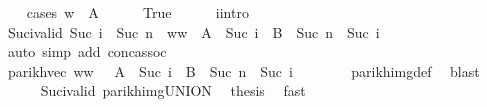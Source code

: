 \begin{isabellebody}
\ \ \isamarkupfalse%
\ {\isacharparenleft}{\kern0pt}cases\ {\isachardoublequoteopen}w{}\ {\isasymin}\ A{\isachardoublequoteclose}{\isacharparenright}{\kern0pt}\isanewline
\ \ \ \ \isamarkupfalse%
\ True\isanewline
\ \ \ \ \isamarkupfalse%
\ i{\isacharunderscore}{\kern0pt}intro\ \isamarkupfalse%
\ Suc{\isacharunderscore}{\kern0pt}i{\isacharunderscore}{\kern0pt}valid{\isacharcolon}{\kern0pt}\ {\isachardoublequoteopen}Suc\ i\ {\isasymle}\ Suc\ n{\isachardoublequoteclose}\ \ {\isachardoublequoteopen}w{}{\isacharat}{\kern0pt}w{}{\isacharprime}{\kern0pt}\ {\isasymin}\ A\ {\isacharcircum}{\kern0pt}{\isacharcircum}{\kern0pt}\ {\isacharparenleft}{\kern0pt}Suc\ i{\isacharparenright}{\kern0pt}\ {\isacharat}{\kern0pt}{\isacharat}{\kern0pt}\ B\ {\isacharcircum}{\kern0pt}{\isacharcircum}{\kern0pt}\ {\isacharparenleft}{\kern0pt}Suc\ n\ {\isacharminus}{\kern0pt}\ Suc\ i{\isacharparenright}{\kern0pt}{\isachardoublequoteclose}\isanewline
\ \ \ \ \ \ \isamarkupfalse%
\ {\isacharparenleft}{\kern0pt}auto\ simp\ add{\isacharcolon}{\kern0pt}\ conc{\isacharunderscore}{\kern0pt}assoc{\isacharparenright}{\kern0pt}\isanewline
\ \ \ \ \isamarkupfalse%
\ \isamarkupfalse%
\ {\isachardoublequoteopen}parikh{\isacharunderscore}{\kern0pt}vec\ {\isacharparenleft}{\kern0pt}w{}{\isacharat}{\kern0pt}w{}{\isacharprime}{\kern0pt}{\isacharparenright}{\kern0pt}\ {\isasymin}\ {\isasymPsi}\ {\isacharparenleft}{\kern0pt}A\ {\isacharcircum}{\kern0pt}{\isacharcircum}{\kern0pt}\ {\isacharparenleft}{\kern0pt}Suc\ i{\isacharparenright}{\kern0pt}\ {\isacharat}{\kern0pt}{\isacharat}{\kern0pt}\ B\ {\isacharcircum}{\kern0pt}{\isacharcircum}{\kern0pt}\ {\isacharparenleft}{\kern0pt}Suc\ n\ {\isacharminus}{\kern0pt}\ Suc\ i{\isacharparenright}{\kern0pt}{\isacharparenright}{\kern0pt}{\isachardoublequoteclose}\isanewline
\ \ \ \ \ \ \isamarkupfalse%
\ parikh{\isacharunderscore}{\kern0pt}img{\isacharunderscore}{\kern0pt}def\ \isamarkupfalse%
\ blast\isanewline
\ \ \ \ \isamarkupfalse%
\ Suc{\isacharunderscore}{\kern0pt}i{\isacharunderscore}{\kern0pt}valid\ parikh{\isacharunderscore}{\kern0pt}img{\isacharunderscore}{\kern0pt}UNION\ \isamarkupfalse%
\ {\isacharquery}{\kern0pt}thesis\ \isamarkupfalse%
\ fast\isanewline
\ \ \isamarkupfalse%
\isanewline
\ \ \ \ \isamarkupfalse%

\end{isabellebody}
